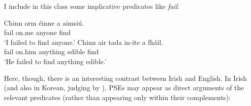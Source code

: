\documentclass[output=paper,colorlinks,citecolor=brown]{langscibook}
\begin{document}

\noindent I include in this class some implicative predicates like {\itshape fail}:

\ea
\ea
\gll Chinn orm éinne a aimsiú. \\
     {fail\past} on.me anyone {\vce} {find\vn} \\
\glt `I failed to find anyone.'
\ex
\gll Chinn air tada in-ite a fháil. \\
     {fail\past} on.him anything edible {\vce} {find\vn} \\
\glt `He failed to find anything edible.'
\z
\z


Here, though, there is an interesting contrast between Irish and English. In Irish (and also in Korean, judging by \cite{lee:95}), PSEs may appear as direct arguments of the relevant predicates (rather than appearing only within their complements):
\end{document}
